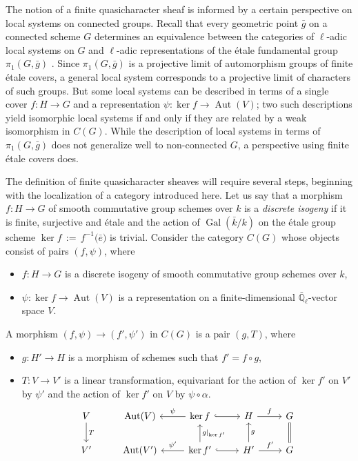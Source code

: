 \documentclass{amsart}
\theoremstyle{plain}
\theoremstyle{definition}
\theoremstyle{remark}
\newcommand{\EE}{\mathbb{\bar Q}_\ell}
\newcommand{\bFq}{\bar{k}}
\newcommand{\Fq}{k}
\DeclareMathOperator{\Gal}{Gal}
\DeclareMathOperator{\Aut}{Aut}
\newcommand{\ceq}{{\, :=\, }}
\newcommand{\bg}{\bar{g}}
\begin{document}
The notion of a finite quasicharacter sheaf is informed
by a certain perspective on local systems on connected groups.
Recall that every geometric point $\bg$ on a connected scheme $G$
determines an equivalence between the categories of $\ell$-adic local systems on $G$
and $\ell$-adic representations of the \'etale fundamental group $\pi_1(G, \bg)$
.
 Since $\pi_1(G, \bg)$ is a projective limit of automorphism groups of finite \'etale covers,
 a general local system corresponds to a projective limit of characters of such groups.
 But some local systems can be described in terms of a single cover $f: H \to G$
 and a representation $\psi: \ker f \to \Aut(V)$;
 two such descriptions yield isomorphic local systems if and only if they are related by a weak
 isomorphism in $C(G)$.  While the description of local systems in terms of $\pi_1(G, \bg)$ does
 not generalize well to non-connected $G$, a perspective using finite \'etale covers does.

The definition of finite quasicharacter sheaves will require several steps,
beginning with the localization of a category introduced here.
Let us say that a morphism $f : H\to G$ of smooth commutative group schemes over $\Fq$ is a \emph{discrete isogeny}
if it is finite, surjective and \'etale and the action of $\Gal(\bFq/\Fq)$ on the \'etale group
scheme $\ker f \ceq f^{-1}({\bar e)}$ is trivial.
Consider the category $C(G)$ whose objects consist of pairs $(f,\psi)$, where
\begin{itemize}
\item $f : H\to G$ is a discrete isogeny of smooth commutative group schemes over $\Fq$,
\item $\psi : \ker f\to \Aut(V)$ is a representation on a finite-dimensional $\EE$-vector space $V$.
\end{itemize}
A morphism $(f,\psi) \to (f',\psi')$ in $C(G)$ is a pair $(g,T)$, where
\begin{itemize}
\item $g : H' \to H$ is a morphism of schemes such that $f' = f\circ g$,
\item $T : V\to V'$ is a linear transformation, equivariant for the action of
$\ker f'$ on $V'$ by $\psi'$ and the action of $\ker f'$ on $V$ by $\psi \circ \alpha$.
\[
\begin{tikzcd}
V \arrow{d}{T} & \Aut(V) & \arrow[swap]{l}{\psi} \ker f \arrow[hook]{r} & H \arrow{r}{f} & \arrow[equal]{d} G\\
V' & \Aut(V') & \arrow[swap]{l}{\psi'} \arrow[swap]{u}{g\vert_{\ker f'}} \ker f' \arrow[hook]{r} & \arrow[swap]{u}{g} H' \arrow{r}{f'} & G
\end{tikzcd}
\]
\end{itemize}
\end{document}
